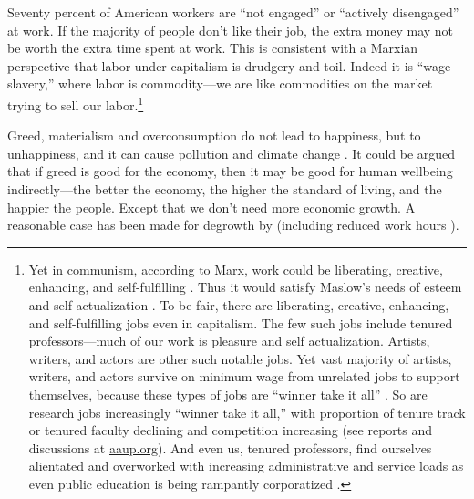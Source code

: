 \documentclass[10pt, letterpaper]{article}
\providecommand{\DIFaddtex}[1]{{\protect\color{blue}\uwave{#1}}} %
\providecommand{\DIFaddbegin}{} %
\providecommand{\DIFaddend}{} %
\providecommand{\DIFadd}[1]{\texorpdfstring{\DIFaddtex{#1}}{#1}} %
\newcommand{\DIFaddincludegraphics}[2][]{{\color{blue}\fbox{\DIFOincludegraphics[#1]{#2}}}} %
\DeclareRobustCommand{\DIFaddbegin}{\DIFOaddbegin \let\includegraphics\DIFaddincludegraphics} %
\DeclareRobustCommand{\DIFaddend}{\DIFOaddend \let\includegraphics\DIFOincludegraphics} %
\begin{document}
\begin{spacing}{1.8}
Seventy percent of American workers are ``not engaged'' or ``actively disengaged'' at work\citep[][]{harvey14}. 
If the majority of people don't like their job, the extra money may not be worth
the extra time spent at work. \DIFaddbegin \DIFadd{Indeed, many suffer from time poverty
\mbox{%
\cite{williams16}}\hspace{0pt}%
. }\DIFaddend This is consistent with a Marxian perspective that labor
under capitalism is drudgery and toil. Indeed it is ``wage slavery,'' where
labor is commodity---we are like commodities on the market trying to sell our labor.\footnote{Yet in communism, according to Marx, work could be
  liberating, creative, enhancing, and self-fulfilling \citep{spencer20}. Thus
  it would satisfy Maslow's needs of esteem and self-actualization
  \citep{maslow87}. 
%
   To be fair, there are liberating, creative, enhancing, and
  self-fulfilling jobs even in capitalism. The few such jobs include tenured professors---much
of our work is pleasure and self actualization. %
Artists, writers, and actors are other such notable jobs. Yet vast majority of
artists, writers, and actors survive on minimum wage from unrelated jobs to support
themselves, because these types of jobs are ``winner take it all''
\citep{frank12}. So are research jobs increasingly ``winner take it all,'' with
proportion of tenure track or tenured faculty declining and competition
increasing (see reports and discussions at \url{aaup.org}).
 And even us, tenured professors, find ourselves alientated and overworked with
 increasing administrative and service loads as even public education is being rampantly corporatized \citep{mills2012corporatization,cox2013corporatization,millsNYT12fa,CatropaNYT20feb8,schmidlinNYT15oct10}.

} 

Greed, materialism and overconsumption do not lead to happiness, but to unhappiness, and it can cause pollution and climate change \citep{leonard10,pachauri14}.
 It could be argued that if greed is good for the economy, then  it may be
 good for human wellbeing indirectly---the better the economy, the higher the
 standard of living, and the happier the people. Except that we don't need more
 economic growth. A reasonable case has been made for degrowth by
 \cite{kallis12,kallis11,bergh11} (including reduced work hours \citep{fitzgerald2018working}).


\end{spacing}
\end{document}

